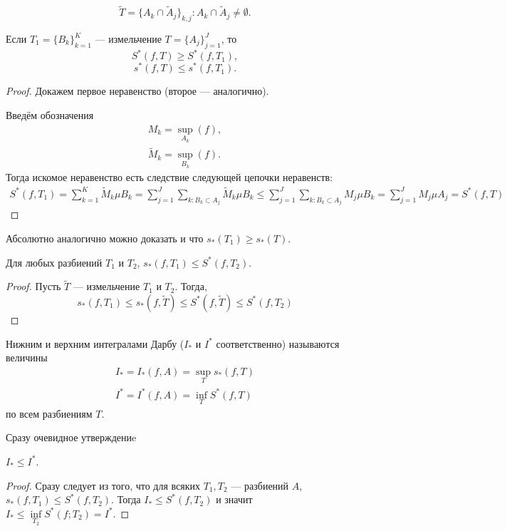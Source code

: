 $$
    \widetilde{T} =  \{A_k \cap \widetilde{A}_j\}_{k, j}:  A_k \cap \widetilde{A}_j \neq \emptyset.
$$
\begin{Lemma}
    Если $T_1 = \{B_k\}_{k=1}^{K}$ --- измельчение $T = \{A_j\}_{j =1}^{J}$, то 
    $$
        S^* (f, T) \geqslant S^*(f, T_1),
    $$
    $$
    s^* (f, T) \leqslant s^*(f, T_1).
    $$
\end{Lemma}
\begin{proof}
    Докажем первое неравенство (второе --- аналогично).
    
    Введём обозначения
    \begin{gather}
        M_k = \sup_{A_k}(f),\\
        \widetilde{M}_k = \sup_{B_k}(f).
    \end{gather}
    Тогда искомое неравенство есть следствие следующей цепочки неравенств:
    \begin{gather}
        S^*(f, T_1) = \sum\limits_{k = 1}^{K}\widetilde{M}_k\mu B_k =  \sum\limits_{j = 1}^{J} \sum\limits_{k\colon B_k \subset A_j} \widetilde{M}_k \mu B_k \leqslant \sum\limits_{j=1}^J  \sum\limits_{k\colon B_k \subset A_j} M_j \mu B_k = \sum\limits_{j=1}^J M_j \mu A_j = S^*(f, T)
    \end{gather}
\end{proof}
Абсолютно аналогично можно доказать и что $s_*(T_1) \geqslant s_*(T)$.
\begin{Statement}
    Для любых разбиений $T_1$ и $T_2$, $s_*(f, T_1) \leqslant S^*(f, T_2)$.
\end{Statement}
\begin{proof}
    Пусть $\widetilde{T}$ --- измельчение $T_1$ и $T_2$. Тогда,
    $$
        s_*(f, T_1) \leqslant s_*(f, \widetilde{T}) \leqslant S^*(f, \widetilde{T}) \leqslant S^*(f, T_2)
    $$
\end{proof}
\begin{Def}
    Нижним и верхним интегралами Дарбу ($I_*$ и $I^*$ соответственно) называются величины
    \begin{gather}
        I_* = I_*(f, A) = \sup_{T} s_*(f,T)\\
        I^* = I^*(f, A) = \inf_{T} S^*(f, T)
    \end{gather}
    по всем разбиениям $T$.
\end{Def}
Сразу очевидное утверждениe
\begin{Statement}
    $I_* \leqslant I^*$.
\end{Statement}
\begin{proof}
    Сразу следует из того, что для всяких $T_1, T_2$ --- разбиений $A$, $s_*(f, T_1) \leqslant S^*(f, T_2)$. Тогда $I_* \leqslant S^*(f, T_2)$ и значит $I_* \leq \inf \limits_{T_2}S^*(f; T_2) = I^*.$
\end{proof}

